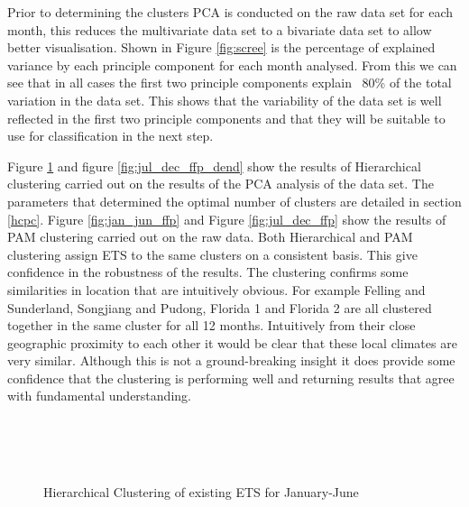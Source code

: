\documentclass{article}
\begin{document}
Prior to determining the clusters PCA is conducted on the raw data set for each month, this reduces the multivariate data set to a bivariate data set to allow better visualisation. Shown in Figure \ref{fig:scree} is the percentage of explained variance by each principle component for each month analysed. From this we can see that in all cases the first two principle components explain ~80\% of the total variation in the data set. This shows that the variability of the data set is well reflected in the first two principle components and that they will be suitable to use for classification in the next step.  

Figure \ref{fig:jan_jun_ffp_dend} and figure \ref{fig:jul_dec_ffp_dend} show the results of Hierarchical clustering carried out on the results of the PCA analysis of the data set. The parameters that determined the optimal number of clusters are detailed in section \ref{hcpc}. Figure \ref{fig:jan_jun_ffp} and Figure \ref{fig:jul_dec_ffp} show the results of PAM clustering carried out on the raw data. Both Hierarchical and PAM clustering assign ETS to the same clusters on a consistent basis. This give confidence in the robustness of the results. The clustering confirms some similarities in location that are intuitively obvious. For example Felling and Sunderland, Songjiang and Pudong, Florida 1 and Florida 2 are all clustered together in the same cluster for all 12 months. Intuitively from their close geographic proximity to each other it would be clear that these local climates are very similar. Although this is not a ground-breaking insight it does provide some confidence that the clustering is performing well and returning results that agree with fundamental understanding. 

\begin{figure}[H]
\centering
{}\hfill
{}\\
\hfill
{}\\
\hfill
{}\\
\caption{Hierarchical Clustering of existing ETS for January-June}
\label{fig:jan_jun_ffp_dend}
\end{figure}
\end{document}
